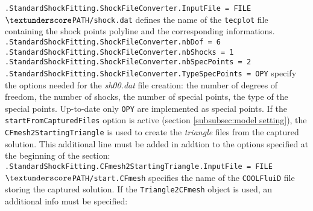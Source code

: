 \documentclass[11pt,a4paper,oneside]{article}
\begin{document}
\newline
\newline
\hspace*{1cm} \texttt{.StandardShockFitting.ShockFileConverter.InputFile = FILE$\textunderscore$PATH/shock.dat}
\newline
\newline
defines the name of the \texttt{tecplot} file containing the shock points polyline and the corresponding informations.
\newline
\newline
\hspace*{1cm} \texttt{.StandardShockFitting.ShockFileConverter.nbDof = 6}
\newline
\hspace*{1cm} \texttt{.StandardShockFitting.ShockFileConverter.nbShocks = 1}
\newline
\hspace*{1cm} \texttt{.StandardShockFitting.ShockFileConverter.nbSpecPoints = 2}
\newline
\hspace*{1cm} \texttt{.StandardShockFitting.ShockFileConverter.TypeSpecPoints = OPY}
\newline
\newline
specify the options needed for the \textit{sh00.dat} file creation: the number of degrees of freedom, the number of shocks, the number of special points, the type of the special points.
\newline
Up-to-date only \texttt{OPY} are implemented as special points.
\newline
\newline
If the \texttt{startFromCapturedFiles} option is active (section \ref{subsubsec:model setting}), the \texttt{CFmesh2StartingTriangle} is used to create the \textit{triangle} files from the captured solution. This additional line must be added in addtion to the options specified at the beginning of the section:
\newline
\newline
\hspace*{1cm} \texttt{.StandardShockFitting.CFmesh2StartingTriangle.InputFile = FILE$\textunderscore$PATH/start.CFmesh}
\newline
\newline
specifies the name of the \texttt{COOLFluiD} file storing the captured solution.
\newline
\newline
If the \texttt{Triangle2CFmesh} object is used, an additional info must be specified:
\end{document}
